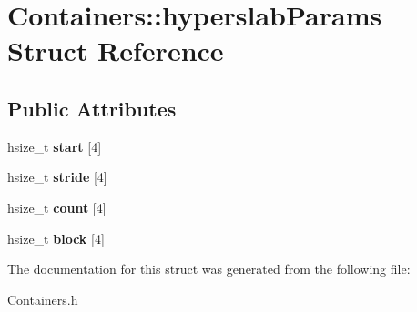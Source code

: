 \hypertarget{structContainers_1_1hyperslabParams}{\section{Containers\+:\+:hyperslab\+Params Struct Reference}
\label{structContainers_1_1hyperslabParams}
}
\subsection*{Public Attributes}
\begin{DoxyCompactItemize}
\item 
\hypertarget{structContainers_1_1hyperslabParams_a5643b5a104304a582e43386460ec4a5f}{hsize\+\_\+t {\bfseries start} \mbox{[}4\mbox{]}}\label{structContainers_1_1hyperslabParams_a5643b5a104304a582e43386460ec4a5f}

\item 
\hypertarget{structContainers_1_1hyperslabParams_a60e540c9a4d0f64aa9490700fea38581}{hsize\+\_\+t {\bfseries stride} \mbox{[}4\mbox{]}}\label{structContainers_1_1hyperslabParams_a60e540c9a4d0f64aa9490700fea38581}

\item 
\hypertarget{structContainers_1_1hyperslabParams_ad8658f630f942c7836cf094dc188bc7c}{hsize\+\_\+t {\bfseries count} \mbox{[}4\mbox{]}}\label{structContainers_1_1hyperslabParams_ad8658f630f942c7836cf094dc188bc7c}

\item 
\hypertarget{structContainers_1_1hyperslabParams_ace460c3ecea21b4fa03c803b99e79110}{hsize\+\_\+t {\bfseries block} \mbox{[}4\mbox{]}}\label{structContainers_1_1hyperslabParams_ace460c3ecea21b4fa03c803b99e79110}

\end{DoxyCompactItemize}


The documentation for this struct was generated from the following file\+:\begin{DoxyCompactItemize}
\item 
Containers.\+h\end{DoxyCompactItemize}
